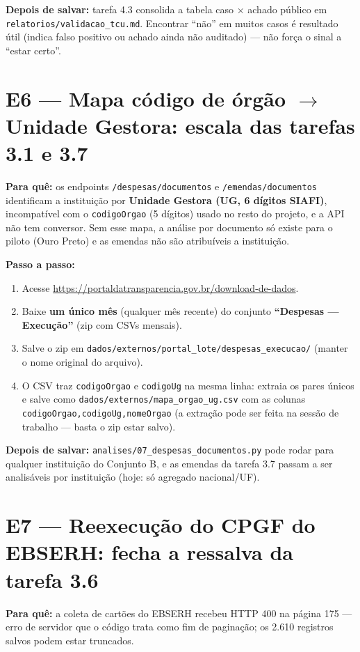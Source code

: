 \documentclass[11pt,a4paper]{article}
\begin{document}
\textbf{Depois de salvar:} tarefa 4.3 consolida a tabela caso × achado
público em \texttt{relatorios/validacao\_tcu.md}. Encontrar ``não'' em
muitos casos é resultado útil (indica falso positivo ou achado ainda não
auditado) --- não força o sinal a ``estar certo''.

\section{E6 --- Mapa código de órgão $\to$ Unidade Gestora: escala das tarefas 3.1 e 3.7}

\textbf{Para quê:} os endpoints \texttt{/despesas/documentos} e
\texttt{/emendas/documentos} identificam a instituição por
\textbf{Unidade Gestora (UG, 6 dígitos SIAFI)}, incompatível com o
\texttt{codigoOrgao} (5 dígitos) usado no resto do projeto, e a API não
tem conversor. Sem esse mapa, a análise por documento só existe para o
piloto (Ouro Preto) e as emendas não são atribuíveis a instituição.

\textbf{Passo a passo:}
\begin{enumerate}
    \item Acesse \url{https://portaldatransparencia.gov.br/download-de-dados}.
    \item Baixe \textbf{um único mês} (qualquer mês recente) do conjunto
    \textbf{``Despesas --- Execução''} (zip com CSVs mensais).
    \item Salve o zip em
    \texttt{dados/externos/portal\_lote/despesas\_execucao/} (manter o
    nome original do arquivo).
    \item O CSV traz \texttt{codigoOrgao} e \texttt{codigoUg} na mesma
    linha: extraia os pares únicos e salve como
    \texttt{dados/externos/mapa\_orgao\_ug.csv} com as colunas
    \texttt{codigoOrgao,codigoUg,nomeOrgao} (a extração pode ser feita na
    sessão de trabalho --- basta o zip estar salvo).
\end{enumerate}

\textbf{Depois de salvar:} \texttt{analises/07\_despesas\_documentos.py}
pode rodar para qualquer instituição do Conjunto B, e as emendas da
tarefa 3.7 passam a ser analisáveis por instituição (hoje: só agregado
nacional/UF).

\section{E7 --- Reexecução do CPGF do EBSERH: fecha a ressalva da tarefa 3.6}

\textbf{Para quê:} a coleta de cartões do EBSERH recebeu HTTP 400 na
página 175 --- erro de servidor que o código trata como fim de paginação;
os 2.610 registros salvos podem estar truncados.
\end{document}
